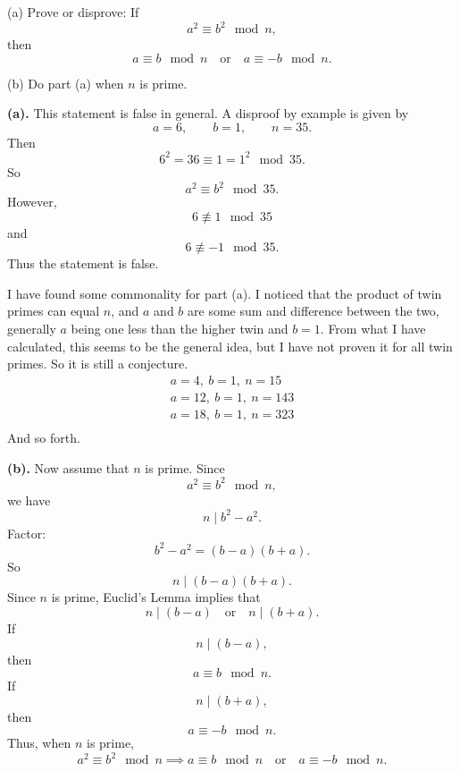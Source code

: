 \begin{problem}{
    (a) Prove or disprove: If
    \[
        a^2\equiv b^2\mod n,
    \]
    then
    \[
        a\equiv b\mod n
        \quad\text{or}\quad
        a\equiv -b\mod n.
    \]

    (b) Do part (a) when $n$ is prime.
}
    \textbf{(a).}
    This statement is false in general.
    A disproof by example is given by
    \[
        a=6,\qquad b=1,\qquad n=35.
    \]
    Then
    \[
        6^2=36\equiv 1=1^2\mod {35}.
    \]
    So
    \[
        a^2\equiv b^2\mod {35}.
    \]
    However,
    \[
        6\not\equiv 1\mod {35}
    \]
    and
    \[
        6\not\equiv -1\mod {35}.
    \]
    Thus the statement is false.

    \begin{remark}
        I have found some commonality for part (a).
        I noticed that the product of twin primes can equal $n$, and $a$ and $b$ are some sum and difference between the two, generally $a$ being one less than the higher twin and $b=1$.
        From what I have calculated, this seems to be the general idea, but I have not proven it for all twin primes.
        So it is still a conjecture.
        \begin{gather*}
            a=4,\ b=1,\ n=15\\
            a=12,\ b=1,\ n=143\\
            a=18,\ b=1,\ n=323\\
        \end{gather*}
        And so forth.
    \end{remark}

    \textbf{(b).}
    Now assume that $n$ is prime.
    Since
    \[
        a^2\equiv b^2\mod n,
    \]
    we have
    \[
        n\mid b^2-a^2.
    \]
    Factor:
    \[
        b^2-a^2=(b-a)(b+a).
    \]
    So
    \[
        n\mid (b-a)(b+a).
    \]
    Since $n$ is prime, Euclid's Lemma implies that
    \[
        n\mid (b-a)
        \quad\text{or}\quad
        n\mid (b+a).
    \]
    If
    \[
        n\mid (b-a),
    \]
    then
    \[
        a\equiv b\mod n.
    \]
    If
    \[
        n\mid (b+a),
    \]
    then
    \[
        a\equiv -b\mod n.
    \]
    Thus, when $n$ is prime,
    \[
        a^2\equiv b^2\mod n
        \implies
        a\equiv b\mod n
        \quad\text{or}\quad
        a\equiv -b\mod n.
    \]
\end{problem}

